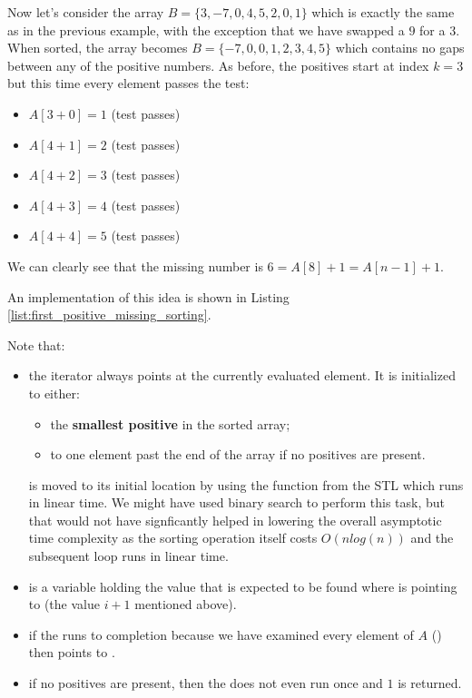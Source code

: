 Now let's consider the array $B=\{ 3,-7,0,4,5,2,0,1\}$ which is exactly the same as in the previous example, with the exception that we have swapped a $9$ for a $3$. When sorted, the array
becomes $B=\{ -7,0,0,1,2,3,4,5\}$ which contains no gaps between any of the positive numbers. As before, the positives start at index $k=3$ but this time every element passes the test:
\begin{itemize}
	\item $A[3+0] = 1$ (test passes)
	\item $A[4+1] = 2$ (test passes)
	\item $A[4+2] = 3$ (test passes)
	\item $A[4+3] = 4$ (test passes)
	\item $A[4+4] = 5$ (test passes)
\end{itemize}
We can clearly see that the missing number is $6 = A[8]+1 = A[n-1]+1$.

An implementation of this idea is shown in Listing
\ref{list:first_positive_missing_sorting}.



Note that:
\begin{itemize}
	\item the iterator  always points at the currently evaluated element. 
	It is initialized to either:
	\begin{itemize}
		\item the \textbf{smallest positive} in the sorted array;
		\item to one element past the end of the array if no positives are present.
	\end{itemize}
	 is moved to its initial location by using the  function from the STL which runs in linear time. We might have used binary search to perform this task, but that would not have signficantly helped in  lowering the overall asymptotic time complexity as the sorting operation itself costs $O(nlog(n))$ and the subsequent  loop runs in linear time. 
	\item {} is a variable holding the value that is expected to be found where  is pointing to (the value $i+1$ mentioned above).
	\item if the  runs to completion because we have examined every element of $A$ () then  points to .
	\item if no positives are present, then the  does not even run once and $1$ is returned.
\end{itemize}

